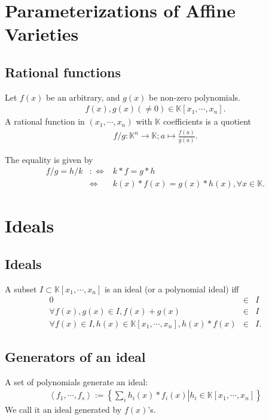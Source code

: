 \documentclass[11pt]{book}
\begin{document}
\section{Parameterizations of Affine Varieties}
\subsection{Rational functions}
Let $f(x)$ be an arbitrary, and $g(x)$ be non-zero polynomials.
\begin{eqnarray}
f(x),g(x) (\neq 0) \in \mathbb{K}[x_1,\cdots,x_n].
\end{eqnarray}
A rational function in $(x_1,\cdots,x_n)$ with $\mathbb{K}$ coefficients is a quotient
\begin{eqnarray}
f/g : \mathbb{K}^n \to \mathbb{K}; a \mapsto \frac{f(a)}{g(a)}.
\end{eqnarray}

The equality is given by
\begin{eqnarray}
f/g = h/k &:\Leftrightarrow& k*f = g*h \\
&\Leftrightarrow& k(x)*f(x) = g(x)*h(x), \forall x \in \mathbb{K}.
\end{eqnarray}

\section{Ideals}
\subsection{Ideals}
\label{DefOfIdeal}
A subset $I \subset \mathbb{K}[x_1,\cdots,x_n]$ is an ideal (or a polynomial ideal) iff
\begin{eqnarray}
0 &\in& I \\
\forall f(x),g(x) \in I, f(x) + g(x) &\in& I \\
\forall f(x) \in I, h(x) \in \mathbb{K}[x_1,\cdots,x_n], h(x)*f(x) &\in& I.
\end{eqnarray}

\subsection{Generators of an ideal}
A set of polynomials generate an ideal:
\begin{eqnarray}
\left< f_1, \cdots, f_s \right> := \left\{ \left. \sum_i h_i(x) * f_i(x) \right| h_i \in \mathbb{K}[x_1,\cdots,x_n] \right\}
\end{eqnarray}
We call it an ideal generated by $f(x)$'s.
\end{document}
